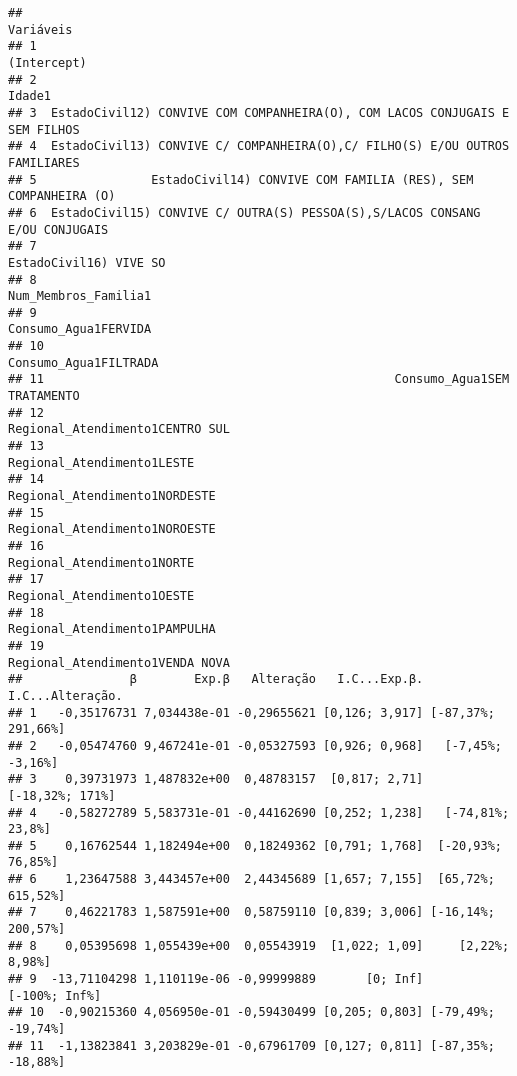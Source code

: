 \documentclass[
]{article}
\begin{document}
\begin{verbatim}
##                                                                      Variáveis
## 1                                                                  (Intercept)
## 2                                                                       Idade1
## 3  EstadoCivil12) CONVIVE COM COMPANHEIRA(O), COM LACOS CONJUGAIS E SEM FILHOS
## 4  EstadoCivil13) CONVIVE C/ COMPANHEIRA(O),C/ FILHO(S) E/OU OUTROS FAMILIARES
## 5                EstadoCivil14) CONVIVE COM FAMILIA (RES), SEM COMPANHEIRA (O)
## 6  EstadoCivil15) CONVIVE C/ OUTRA(S) PESSOA(S),S/LACOS CONSANG E/OU CONJUGAIS
## 7                                                       EstadoCivil16) VIVE SO
## 8                                                         Num_Membros_Familia1
## 9                                                         Consumo_Agua1FERVIDA
## 10                                                       Consumo_Agua1FILTRADA
## 11                                                 Consumo_Agua1SEM TRATAMENTO
## 12                                             Regional_Atendimento1CENTRO SUL
## 13                                                  Regional_Atendimento1LESTE
## 14                                               Regional_Atendimento1NORDESTE
## 15                                               Regional_Atendimento1NOROESTE
## 16                                                  Regional_Atendimento1NORTE
## 17                                                  Regional_Atendimento1OESTE
## 18                                               Regional_Atendimento1PAMPULHA
## 19                                             Regional_Atendimento1VENDA NOVA
##               β        Exp.β   Alteração   I.C...Exp.β.   I.C...Alteração.
## 1   -0,35176731 7,034438e-01 -0,29655621 [0,126; 3,917] [-87,37%; 291,66%]
## 2   -0,05474760 9,467241e-01 -0,05327593 [0,926; 0,968]   [-7,45%; -3,16%]
## 3    0,39731973 1,487832e+00  0,48783157  [0,817; 2,71]    [-18,32%; 171%]
## 4   -0,58272789 5,583731e-01 -0,44162690 [0,252; 1,238]   [-74,81%; 23,8%]
## 5    0,16762544 1,182494e+00  0,18249362 [0,791; 1,768]  [-20,93%; 76,85%]
## 6    1,23647588 3,443457e+00  2,44345689 [1,657; 7,155]  [65,72%; 615,52%]
## 7    0,46221783 1,587591e+00  0,58759110 [0,839; 3,006] [-16,14%; 200,57%]
## 8    0,05395698 1,055439e+00  0,05543919  [1,022; 1,09]     [2,22%; 8,98%]
## 9  -13,71104298 1,110119e-06 -0,99999889       [0; Inf]      [-100%; Inf%]
## 10  -0,90215360 4,056950e-01 -0,59430499 [0,205; 0,803] [-79,49%; -19,74%]
## 11  -1,13823841 3,203829e-01 -0,67961709 [0,127; 0,811] [-87,35%; -18,88%]

\end{verbatim}
\end{document}
